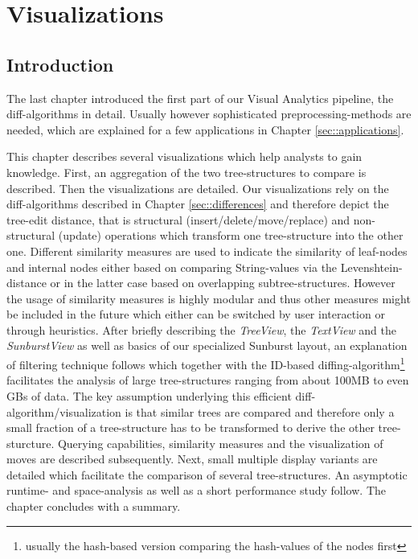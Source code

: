 \section{Visualizations}\label{sec::visualizations}
\subsection{Introduction}
The last chapter introduced the first part of our Visual Analytics pipeline, the diff-algorithms in detail. Usually however sophisticated preprocessing-methods are needed, which are explained for a few applications in Chapter \ref{sec::applications}.

This chapter describes several visualizations which help analysts to gain knowledge. First, an aggregation of the two tree-structures to compare is described. Then the visualizations are detailed. Our visualizations rely on the diff-algorithms described in Chapter \ref{sec::differences} and therefore depict the tree-edit distance, that is structural (insert/delete/move/replace) and non-structural (update) operations which transform one tree-structure into the other one. Different similarity measures are used to indicate the similarity of leaf-nodes and internal nodes either based on comparing String-values via the Levenshtein-distance or in the latter case based on overlapping subtree-structures. However the usage of similarity measures is highly modular and thus other measures might be included in the future which either can be switched by user interaction or through heuristics. After briefly describing the \emph{TreeView}, the \emph{TextView} and the \emph{SunburstView} as well as basics of our specialized Sunburst layout, an explanation of filtering technique follows which together with the ID-based diffing-algorithm\footnote{usually the hash-based version comparing the hash-values of the nodes first} facilitates the analysis of large tree-structures ranging from about 100MB to even GBs of data. The key assumption underlying this efficient diff-algorithm/visualization is that similar trees are compared and therefore only a small fraction of a tree-structure has to be transformed to derive the other tree-sturcture. Querying capabilities, similarity measures and the visualization of moves are described subsequently. Next, small multiple display variants are detailed which facilitate the comparison of several tree-structures. An asymptotic runtime- and space-analysis as well as a short performance study follow. The chapter concludes with a summary.

